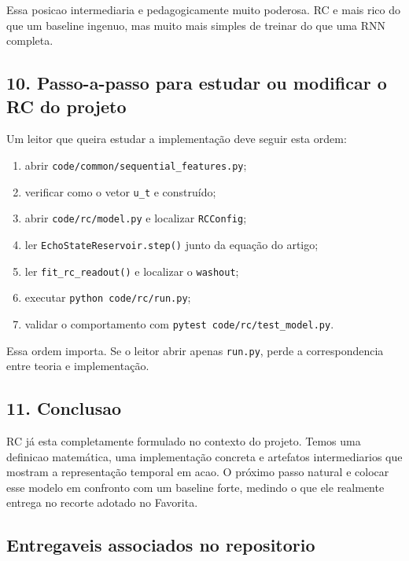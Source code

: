 \documentclass[12pt]{article}
\providecommand{\tightlist}{%
          \setlength{\itemsep}{0pt}\setlength{\parskip}{0pt}}
\begin{document}
Essa posicao intermediaria e pedagogicamente muito poderosa. RC e mais rico do que um baseline ingenuo, mas muito mais simples de treinar do que uma RNN completa.

\subsection{10. Passo-a-passo para estudar ou modificar o RC do projeto}\label{10-passo-a-passo-para-estudar-ou-modificar-o-rc-do-projeto}

Um leitor que queira estudar a implementação deve seguir esta ordem:

\begin{enumerate}
\def\labelenumi{\arabic{enumi}.}
\tightlist
\item
  abrir \texttt{code/common/sequential\_features.py};
\item
  verificar como o vetor \texttt{u\_t} e construído;
\item
  abrir \texttt{code/rc/model.py} e localizar \texttt{RCConfig};
\item
  ler \texttt{EchoStateReservoir.step()} junto da equação do artigo;
\item
  ler \texttt{fit\_rc\_readout()} e localizar o \texttt{washout};
\item
  executar \texttt{python\ code/rc/run.py};
\item
  validar o comportamento com \texttt{pytest\ code/rc/test\_model.py}.
\end{enumerate}

Essa ordem importa. Se o leitor abrir apenas \texttt{run.py}, perde a correspondencia entre teoria e implementação.

\subsection{11. Conclusao}\label{11-conclusao}

RC já esta completamente formulado no contexto do projeto. Temos uma definicao matemática, uma implementação concreta e artefatos intermediarios que mostram a representação temporal em acao. O próximo passo natural e colocar esse modelo em confronto com um baseline forte, medindo o que ele realmente entrega no recorte adotado no Favorita.

\subsection{Entregaveis associados no repositorio}\label{entregaveis-associados-no-repositorio}
\end{document}
